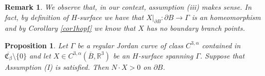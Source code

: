 \documentclass[a4paper,reqno,10pt,oneside]{amsart}
\numberwithin{equation}{section}
\newtheorem{proposition}[theorem]{Proposition}
\newtheorem{remark}[theorem]{Remark}
\begin{document}
 

\begin{remark} \label{remarkposorientms}
We observe that, in our context, assumption (iii) makes sense. In fact, by definition of $H$-surface we have that $X|_{\partial B}\colon\partial B \to \Gamma$ is an homeomorphism and by Corollary \ref{cor1hopf} we know that $X$ has no boundary branch points.
\end{remark}

\begin{proposition}\label{propsegnposboundary}
Let $\Gamma$ be a regular Jordan curve of class $C^{3,\alpha}$ contained in $\overline{\mathfrak{C}_\beta} \setminus \{0\}$ and let $X \in C^{3,\alpha}(\overline{B}, {\mathbb R}^3)$ be an $H$-surface spanning $\Gamma$. Suppose that Assumption (I) is satisfied. Then $N \cdot X>0$ on $\partial B$.
\end{proposition}
\end{document}
